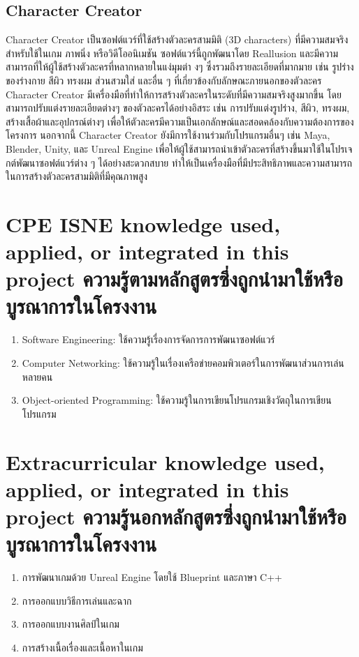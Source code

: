\subsection{Character Creator}
Character Creator เป็นซอฟต์แวร์ที่ใช้สร้างตัวละครสามมิติ (3D characters) ที่มีความสมจริงสำหรับใช้ในเกม ภาพนิ่ง หรือวิดีโออนิเมชัน ซอฟต์แวร์นี้ถูกพัฒนาโดย Reallusion และมีความสามารถที่ให้ผู้ใช้สร้างตัวละครที่หลากหลายในแง่มุมต่า งๆ ซึ่งรวมถึงรายละเอียดที่มากมาย เช่น รูปร่างของร่างกาย สีผิว ทรงผม ส่วนสวมใส่ และอื่น ๆ ที่เกี่ยวข้องกับลักษณะภายนอกของตัวละคร
Character Creator มีเครื่องมือที่ทำให้การสร้างตัวละครในระดับที่มีความสมจริงสูงมากขึ้น โดยสามารถปรับแต่งรายละเอียดต่างๆ ของตัวละครได้อย่างอิสระ เช่น การปรับแต่งรูปร่าง, สีผิว, ทรงผม, สร้างเสื้อผ้าและอุปกรณ์ต่างๆ เพื่อให้ตัวละครมีความเป็นเอกลักษณ์และสอดคล้องกับความต้องการของโครงการ
นอกจากนี้ Character Creator ยังมีการใช้งานร่วมกับโปรแกรมอื่นๆ เช่น Maya, Blender, Unity, และ Unreal Engine เพื่อให้ผู้ใช้สามารถนำเข้าตัวละครที่สร้างขึ้นมาใช้ในโปรเจกต์พัฒนาซอฟต์แวร์ต่าง ๆ ได้อย่างสะดวกสบาย ทำให้เป็นเครื่องมือที่มีประสิทธิภาพและความสามารถในการสร้างตัวละครสามมิติที่มีคุณภาพสูง


\section{\ifenglish%
\ifcpe CPE \else ISNE \fi knowledge used, applied, or integrated in this project
\else%
ความรู้ตามหลักสูตรซึ่งถูกนำมาใช้หรือบูรณาการในโครงงาน
\fi
}

\begin{enumerate}
  \item Software Engineering: ใช้ความรู้เรื่องการจัดการการพัฒนาซอฟต์แวร์
  \item Computer Networking: ใช้ความรู้ในเรื่องเครือข่ายคอมพิวเตอร์ในการพัฒนาส่วนการเล่นหลายคน
  \item Object-oriented Programming: ใช้ความรู้ในการเขียนโปรแกรมเชิงวัตถุในการเขียนโปรแกรม
\end{enumerate}


\section{\ifenglish%
Extracurricular knowledge used, applied, or integrated in this project
\else%
ความรู้นอกหลักสูตรซึ่งถูกนำมาใช้หรือบูรณาการในโครงงาน
\fi
}


\begin{enumerate}
  \item การพัฒนาเกมด้วย Unreal Engine โดยใช้ Blueprint และภาษา C++
  \item การออกแบบวิธีการเล่นและฉาก
  \item การออกแบบงานศิลป์ในเกม
  \item การสร้างเนื้อเรื่องและเนื้อหาในเกม
\end{enumerate}

